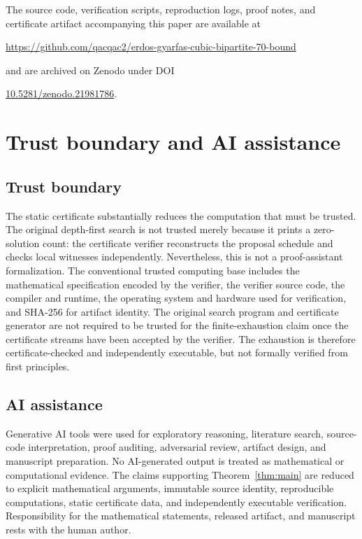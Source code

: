 \documentclass[11pt]{article}
\theoremstyle{remark}
\begin{document}
The source code, verification scripts, reproduction logs, proof notes,
and certificate artifact accompanying this paper are available at
\begin{center}
\url{https://github.com/qacqac2/erdos-gyarfas-cubic-bipartite-70-bound}
\end{center}
and are archived on Zenodo under DOI
\begin{center}
\href{https://doi.org/10.5281/zenodo.21981786}
{10.5281/zenodo.21981786}.
\end{center}


\section{Trust boundary and AI assistance}\label{sec:trust}

\subsection{Trust boundary}

The static certificate substantially reduces the computation that must be trusted.  The original depth-first search is not trusted merely because it prints a zero-solution count: the certificate verifier reconstructs the proposal schedule and checks local witnesses independently.  Nevertheless, this is not a proof-assistant formalization.  The conventional trusted computing base includes the mathematical specification encoded by the verifier, the verifier source code, the compiler and runtime, the operating system and hardware used for verification, and SHA-256 for artifact identity.  The original search program and certificate generator are not required to be trusted for the finite-exhaustion claim once the certificate streams have been accepted by the verifier.  The exhaustion is therefore certificate-checked and independently executable, but not formally verified from first principles.

\subsection{AI assistance}

Generative AI tools were used for exploratory reasoning, literature search, source-code interpretation, proof auditing, adversarial review, artifact design, and manuscript preparation.  No AI-generated output is treated as mathematical or computational evidence.  The claims supporting Theorem~\ref{thm:main} are reduced to explicit mathematical arguments, immutable source identity, reproducible computations, static certificate data, and independently executable verification.  Responsibility for the mathematical statements, released artifact, and manuscript rests with the human author.
\end{document}
